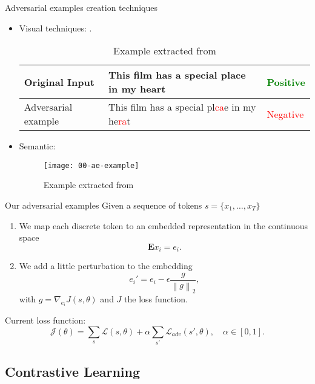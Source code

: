 \documentclass[aspectratio=169]{beamer}
\newcommand{\norm}[1]{\left\lVert#1\right\rVert}
\begin{document}
  \begin{frame}{Adversarial examples creation techniques}

    \begin{itemize}
      \item Visual techniques: \citep{DBLP:journals/corr/abs-2005-05909}.
      \begin{table}[H]
        \begin{tabular}{l|l|l}
        Original Input      & This film has a special place in my heart & \textcolor{green}{Positive} \\ \hline
        Adversarial example & This film has a special pl\textcolor{red}{ca}e in my he\textcolor{red}{ra}t & \textcolor{red}{Negative}
        \end{tabular}
        \caption{Example extracted from \citep{DBLP:journals/corr/abs-1801-04354}}
        \end{table}
      \item Semantic:\citep{DBLP:journals/corr/abs-1907-11932}
      \begin{figure}[H]
        \centering
        \texttt{[image: 00-ae-example]}
        \caption{Example extracted from \citep{DBLP:journals/corr/abs-1907-11932}}
      \end{figure}

    \end{itemize}
  \end{frame}

  \begin{frame}{Our adversarial examples}
    Given a sequence of tokens \(s = \{x_1,\dots,x_T\}\)
    \begin{enumerate}
      \item We map each discrete token to an embedded representation in the continuous space
      \[
        \mathbf{E}x_i = e_i.  
      \]
      \item We add a little perturbation to the embedding
      \[
      e_i' = e_i - \epsilon \frac{g}{\norm{g}_2},   
      \]
      with \(g = \nabla_{e_i}J(s,\theta)\) and \(J\) the loss function.
    \end{enumerate}

    Current loss function:
    \[
    \mathcal J(\theta) = \sum_s \mathcal L(s,\theta) + \alpha \sum_{s'} \mathcal L_{adv} (s',\theta), \quad \alpha \in [0,1].  
    \]
  \end{frame}

  \subsection{Contrastive Learning}
\end{document}
